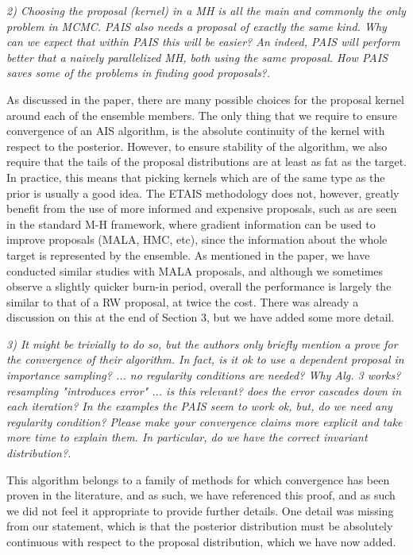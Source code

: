 \documentclass{article}
\newcommand{\comment}[2]{\vspace{0.6cm}{\bf Comment:} {\it #1.}

\vspace{0.3cm}{\bf Answer:} #2}
\begin{document}
\comment{2) Choosing the proposal (kernel) in a MH is all the main and commonly the only problem in MCMC. PAIS also needs a proposal of exactly the same kind. Why can we expect that within PAIS this will be easier? An indeed, PAIS will perform better that a naively parallelized MH, both using the same proposal. How PAIS saves some of the problems in finding good proposals?}{As discussed in the paper, there are many possible choices for the proposal kernel around each of the ensemble members. The only thing that we require to ensure convergence of an AIS algorithm, is the absolute continuity of the kernel with respect to the posterior. However, to ensure stability of the algorithm, we also require that the tails of the proposal distributions are at least as fat as the target. In practice, this means that picking kernels which are of the same type as the prior is usually a good idea. The ETAIS methodology does not, however, greatly benefit from the use of more informed and expensive proposals, such as are seen in the standard M-H framework, where gradient information can be used to improve proposals (MALA, HMC, etc), since the information about the whole target is represented by the ensemble. As mentioned in the paper, we have conducted similar studies with MALA proposals, and although we sometimes observe a slightly quicker burn-in period, overall the performance is largely the similar to that of a RW proposal, at twice the cost. There was already a discussion on this at the end of Section 3, but we have added some more detail.}

\comment{3) It might be trivially to do so, but the authors only briefly mention a prove for the convergence of their algorithm. In fact, is it ok to use a dependent proposal in importance sampling? ... no regularity conditions are needed? Why Alg. 3 works? resampling "introduces error" ... is this relevant? does the error cascades down in each iteration? In the examples the PAIS seem to work ok, but, do we need any regularity condition? Please make your convergence claims more explicit and take more time to explain them. In particular, do we have the correct invariant distribution?}{This algorithm belongs to a family of methods for which convergence has been proven in the literature, and as such, we have referenced this proof, and as such we did not feel it appropriate to provide further details. One detail was missing from our statement, which is that the posterior distribution must be absolutely continuous with respect to the proposal distribution, which we have now added.}
\end{document}
